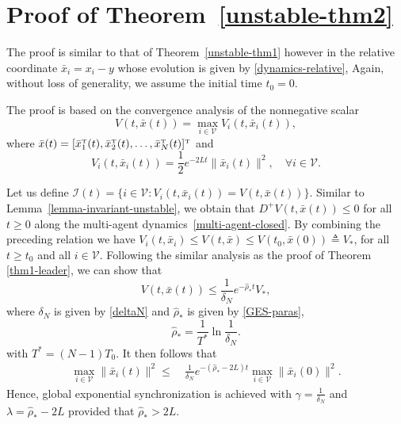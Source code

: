 \documentclass[a4paper, 11pt]{article}
\def \defn{\triangleq}
\newcommand{\T}{^{\mbox{\tiny T}}}
\begin{document}
\section{Proof of Theorem~\ref{unstable-thm2}}\label{app-lf3}
The proof is similar to that of Theorem~\ref{unstable-thm1} however in the relative coordinate $\bar{x}_i=x_i-y$ whose evolution is given by \eqref{dynamics-relative}, Again, without loss of generality, we assume the initial time $t_0=0$.

The proof is based on the convergence analysis of the nonnegative scalar
\begin{equation}\label{unstable-lyap}
V(t,\bar{x}(t))=\max_{i\in\mathcal{V}}V_i(t,\bar{x}_i(t)),
\end{equation}
where $\bar{x}(t)=[\bar{x}_1\T(t),\bar{x}_2\T(t),\dots,\bar{x}_N\T(t)]\T$ and
\begin{equation}\label{unstable-agent-lyap}
V_i(t,\bar{x}_i(t))=\frac{1}{2}e^{-2L t} \|\bar{x}_i(t)\|^2, \quad \forall i\in\mathcal{V}.
\end{equation}


Let us define $\mathcal{I}(t)=\{i\in\mathcal{V}: V_{i}(t,\bar{x}_i(t))=V(t,\bar{x}(t))\}$.
Similar to Lemma~\ref{lemma-invariant-unstable}, we obtain that $D^+V(t,\bar{x}(t)) \leq 0$ for all $t \geq 0$ along the multi-agent dynamics~\eqref{multi-agent-closed}.
By combining the preceding relation we have $V_i(t,\bar{x}_i)\leq V(t,\bar{x}) \leq V(t_0,\bar{x}(0)) \defn V_*$, for all $t\geq t_0$ and all $i\in\mathcal{V}$.
Following the similar analysis as the proof of Theorem \ref{thm1-leader}, we can show that
\begin{equation*}
V(t,\bar{x}(t))\leq \frac{1}{\delta_N} e^{-\hat{\rho}_* t}V_*,
\end{equation*}
where $\delta_N$ is given by  \eqref{deltaN} and $\hat{\rho}_*$ is given by \eqref{GES-paras},
\begin{equation}\label{GES-paras}
\hat{\rho}_*=\frac{1}{T^{*}} \ln \frac{1}{\delta_N}.
\end{equation}
with $T^*=(N-1)T_0$. It then follows that
\begin{align*}
\max_{i\in\mathcal{V}}\|\bar{x}_i(t)\|^2\leq &~\frac{1}{\delta_N} e^{-(\hat{\rho}_*-2L)t}\max_{i\in\mathcal{V}}\|\bar{x}_i(0)\|^2.
\end{align*}
Hence, global exponential synchronization is achieved with $\gamma=\frac{1}{\delta_N}$ and $\lambda=\hat{\rho}_*-2L$ provided that $\hat{\rho}_*>2L$. 
\end{document}
